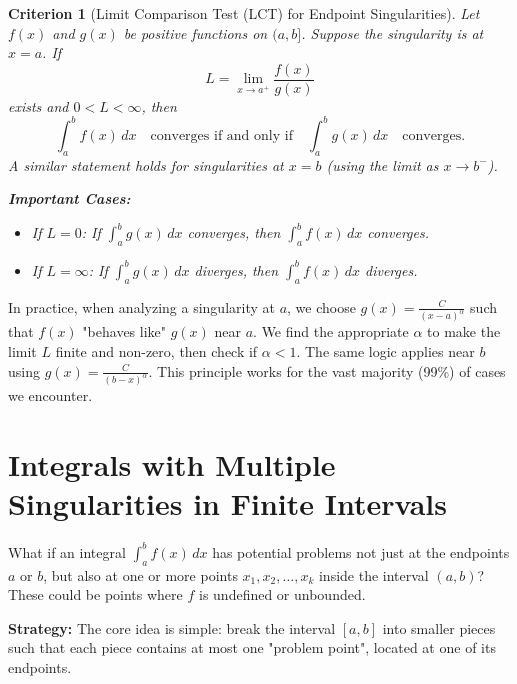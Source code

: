 \documentclass[11pt]{article}
\theoremstyle{mytheoremstyle}
\newtheorem{criterion}[theorem]{Criterion}
\theoremstyle{mydefinitionstyle}
\begin{document}
\begin{criterion}[Limit Comparison Test (LCT) for Endpoint Singularities]
Let $f(x)$ and $g(x)$ be positive functions on $(a, b]$. Suppose the singularity is at $x=a$. If
\[ L = \lim_{x \to a^+} \frac{f(x)}{g(x)} \]
exists and $0 < L < \infty$, then
\[ \int_a^b f(x) \, dx \quad \text{converges if and only if} \quad \int_a^b g(x) \, dx \quad \text{converges.} \]
A similar statement holds for singularities at $x=b$ (using the limit as $x \to b^-$).

\textbf{Important Cases:}
\begin{itemize}
    \item If $L=0$: If $\int_a^b g(x) \, dx$ converges, then $\int_a^b f(x) \, dx$ converges.
    \item If $L=\infty$: If $\int_a^b g(x) \, dx$ diverges, then $\int_a^b f(x) \, dx$ diverges.
\end{itemize}
\end{criterion}

In practice, when analyzing a singularity at $a$, we choose $g(x) = \frac{C}{(x-a)^\alpha}$ such that $f(x)$ "behaves like" $g(x)$ near $a$. We find the appropriate $\alpha$ to make the limit $L$ finite and non-zero, then check if $\alpha < 1$. The same logic applies near $b$ using $g(x) = \frac{C}{(b-x)^\alpha}$. This principle works for the vast majority (99\%) of cases we encounter.

\section{Integrals with Multiple Singularities in Finite Intervals}

What if an integral $\int_a^b f(x) \, dx$ has potential problems not just at the endpoints $a$ or $b$, but also at one or more points $x_1, x_2, \dots, x_k$ inside the interval $(a, b)$? These could be points where $f$ is undefined or unbounded.

\textbf{Strategy:} The core idea is simple: break the interval $[a, b]$ into smaller pieces such that each piece contains at most one "problem point", located at one of its endpoints.
\end{document}
